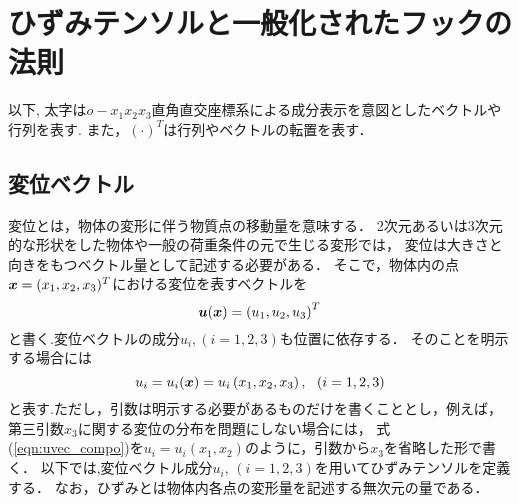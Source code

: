 \documentclass[10pt,a4j]{jbook}
\newlength{\minitwocolumn}
\begin{document}
\newcommand{\fat}[1]{\mbox{\boldmath $#1$}}
\newcommand{\D}{\partial}
\newcommand{\w}{\omega}
\newcommand{\ga}{\alpha}
\newcommand{\gb}{\beta}
\newcommand{\gx}{\xi}
\newcommand{\gz}{\zeta}
\newcommand{\vhat}[1]{\hat{\fat{#1}}}
\newcommand{\spc}{\vspace{0.7\baselineskip}}
\newcommand{\halfspc}{\vspace{0.3\baselineskip}}

\newcommand{\twofig}[2]
 {
   \begin{figure}
     \begin{minipage}[t]{\minitwocolumn}
         \begin{center}   #1
         \end{center}
     \end{minipage}
         \hspace{\columnsep}
     \begin{minipage}[t]{\minitwocolumn}
         \begin{center} #2
         \end{center}
     \end{minipage}
   \end{figure}
 }
\setcounter{chapter}{2}
\chapter{ひずみテンソルと一般化されたフックの法則}
以下, 太字は$o-x_1x_2x_3$直角直交座標系による成分表示を意図としたベクトルや行列を表す.
また，$(\cdot)^T$は行列やベクトルの転置を表す．
\section{変位ベクトル}
変位とは，物体の変形に伴う物質点の移動量を意味する．
2次元あるいは3次元的な形状をした物体や一般の荷重条件の元で生じる変形では，
変位は大きさと向きをもつベクトル量として記述する必要がある．
そこで，物体内の点$\fat{x}=(x_1,x_2,x_3)^T$における変位を表すベクトルを
\begin{equation}
	\fat{u}(\fat{x})=\left( u_1, u_2, u_3 \right)^T
	\label{eqn:uvec}
\end{equation}
と書く.変位ベクトルの成分$u_i,(i=1,2,3)$も位置に依存する．
そのことを明示する場合には
\begin{equation}
	u_i=u_i(\fat{x})=u_i\left(x_1, x_2, x_3\right), \ \ (i=1,2,3)
	\label{eqn:uvec_compo}
\end{equation}
と表す.ただし，引数は明示する必要があるものだけを書くこととし，例えば，
第三引数$x_3$に関する変位の分布を問題にしない場合には，
式(\ref{eqn:uvec_compo})を$u_i=u_i(x_1,x_2)$のように，引数から$x_3$を省略した形で書く．
以下では,変位ベクトル成分$u_i,\,(i=1,2,3)$を用いてひずみテンソルを定義する．
なお，ひずみとは物体内各点の変形量を記述する無次元の量である．
%
\end{document}
